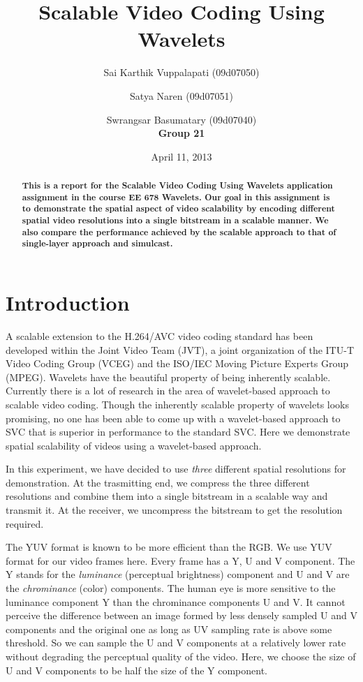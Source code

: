 \documentclass[10pt,twocolumn]{article}
\title{Scalable Video Coding Using Wavelets}
\author{Sai Karthik Vuppalapati (09d07050) \\
\and Satya Naren (09d07051) \\
\and Swrangsar Basumatary (09d07040) \\
\textbf{Group 21}}
\date{April 11, 2013}
\begin{document}
\maketitle

\begin{abstract}
    \textbf{This is a report for the Scalable Video Coding Using Wavelets application assignment in the course EE 678 Wavelets. Our goal in this assignment is to demonstrate the spatial aspect of video scalability by encoding different spatial video resolutions into a single bitstream in a scalable manner. We also compare the performance achieved by the scalable approach to that of single-layer approach and simulcast.}
\end{abstract}

\section{Introduction}
A scalable extension to the H.264/AVC video coding standard has been developed within the Joint Video Team (JVT), a joint organization of the ITU-T Video Coding Group (VCEG) and the ISO/IEC Moving Picture Experts Group (MPEG)\cite{segall2007}. Wavelets have the beautiful property of being inherently scalable\cite{daubechies1990, daubechies1996}. Currently there is a lot of research in the area of wavelet-based approach to scalable video coding\cite{signoroni2007}. Though the inherently scalable property of wavelets looks promising, no one has been able to come up with a wavelet-based approach to SVC that is superior in performance to the standard SVC. Here we demonstrate spatial scalability of videos using a wavelet-based approach.

In this experiment, we have decided to use \emph{three} different spatial resolutions for demonstration. At the trasmitting end, we compress the three different resolutions and combine them into a single bitstream in a scalable way and transmit it. At the receiver, we uncompress the bitstream to get the resolution required.

The YUV format is known to be more efficient than the RGB. We use YUV format for our video frames here. Every frame has a Y, U and V component. The Y stands for the \emph{luminance} (perceptual brightness) component and U and V are the \emph{chrominance} (color) components.  The human eye is more sensitive to the luminance component Y than the chrominance components U and V. It cannot perceive the difference between an image formed by less densely sampled U and V components and the original one as long as UV sampling rate is above some threshold. So we can sample the U and V components at a relatively lower rate without degrading the perceptual quality of the video. Here, we choose the size of U and V components to be half the size of the Y component.
\end{document}
